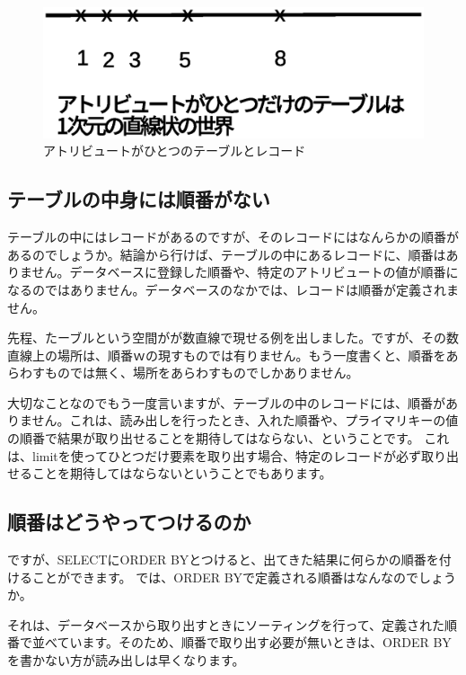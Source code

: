 \begin{figure}[htbp]
	\includegraphics[width=12cm,clip]{draw/line.eps}
	\caption{アトリビュートがひとつのテーブルとレコード}
	\label{fig:line_like}
\end{figure}

\subsection{テーブルの中身には順番がない}


テーブルの中にはレコードがあるのですが、そのレコードにはなんらかの順番があるのでしょうか。結論から行けば、テーブルの中にあるレコードに、順番はありません。データベースに登録した順番や、特定のアトリビュートの値が順番になるのではありません。データベースのなかでは、レコードは順番が定義されません。

先程、たーブルという空間がが数直線で現せる例を出しました。ですが、その数直線上の場所は、順番ｗの現すものでは有りません。もう一度書くと、順番をあらわすものでは無く、場所をあらわすものでしかありません。

大切なことなのでもう一度言いますが、テーブルの中のレコードには、順番がありません。これは、読み出しを行ったとき、入れた順番や、プライマリキーの値の順番で結果が取り出せることを期待してはならない、ということです。
これは、limitを使ってひとつだけ要素を取り出す場合、特定のレコードが必ず取り出せることを期待してはならないということでもあります。

\subsection{順番はどうやってつけるのか}

ですが、SELECTにORDER BYとつけると、出てきた結果に何らかの順番を付けることができます。
では、ORDER BYで定義される順番はなんなのでしょうか。

それは、データベースから取り出すときにソーティングを行って、定義された順番で並べています。そのため、順番で取り出す必要が無いときは、ORDER BYを書かない方が読み出しは早くなります。



